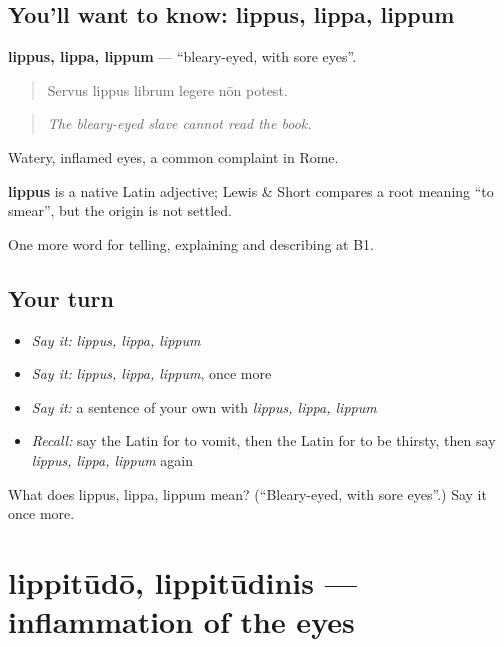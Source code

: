 \subsection*{You'll want to know: lippus, lippa, lippum}
\textbf{lippus, lippa, lippum} — \textquotedblleft{}bleary-eyed, with sore eyes\textquotedblright{}.

\begin{quote}
Servus lippus librum legere nōn potest.
\end{quote}

\begin{quote}
\emph{The bleary-eyed slave cannot read the book.}
\end{quote}

Watery, inflamed eyes, a common complaint in Rome.

\begin{cousinweb}
\textbf{lippus} is a native Latin adjective; Lewis \& Short compares a root meaning \textquotedblleft{}to smear\textquotedblright{}, but the origin is not settled.
\end{cousinweb}

\begin{grammarlens}[title={What you've built}]
One more word for telling, explaining and describing at B1.
\end{grammarlens}

\subsection*{Your turn}
\begin{itemize}
\raggedright
  \item \emph{Say it:} \emph{lippus, lippa, lippum}
  \item \emph{Say it:} \emph{lippus, lippa, lippum}, once more
  \item \emph{Say it:} a sentence of your own with \emph{lippus, lippa, lippum}
  \item \emph{Recall:} say the Latin for to vomit, then the Latin for to be thirsty, then say \emph{lippus, lippa, lippum} again
\end{itemize}

\begin{tcolorbox}[breakable,colback=teal!4,colframe=teal!35!black,title={Before you move on}]
What does lippus, lippa, lippum mean? (\textquotedblleft{}Bleary-eyed, with sore eyes\textquotedblright{}.) Say it once more.
\end{tcolorbox}
\section[lippitūdō, lippitūdinis]{lippitūdō, lippitūdinis — inflammation of the eyes}

